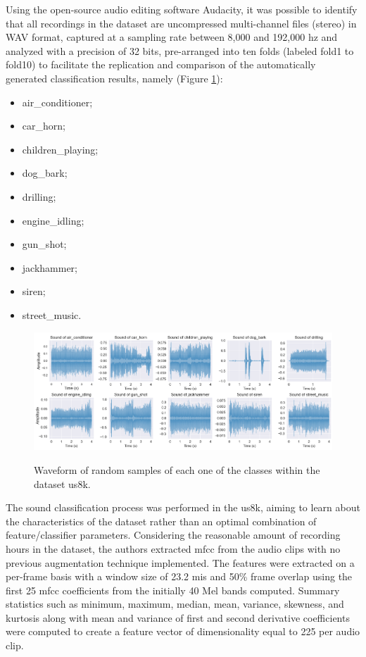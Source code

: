 Using the open-source audio editing software Audacity, it was possible to identify that all recordings in the dataset are uncompressed multi-channel files (stereo) in WAV format, captured at a sampling rate between 8,000 and 192,000 \gls{hz} and analyzed with a precision of 32 bits, pre-arranged into ten folds (labeled fold1 to fold10) to facilitate the replication and comparison of the automatically generated classification results, namely (Figure \ref{fig:methods_dataset_US8K}):
\begin{itemize}
    \item air\_conditioner;
    \item car\_horn;
    \item children\_playing; 
    \item dog\_bark; 
    \item drilling; 
    \item engine\_idling; 
    \item gun\_shot; 
    \item jackhammer; 
    \item siren; 
    \item street\_music.
\end{itemize}

\vspace{12pt}

\begin{figure}[htbp]
    \raggedright
        \caption{Waveform of random samples of each one of the classes within the dataset \gls{us8k}.}
        \includegraphics[width=1\textwidth]{resources/images/050-methods/Methods_dataset_US8K.png}
        \label{fig:methods_dataset_US8K}
\end{figure}

The sound classification process was performed in the \gls{us8k}, aiming to learn about the characteristics of the dataset rather than an optimal combination of feature/classifier parameters. Considering the reasonable amount of recording hours in the dataset, the authors extracted \gls{mfcc} from the audio clips with no previous augmentation technique implemented. The features were extracted on a per-frame basis with a window size of 23.2 \gls{mi}\gls{s} and 50\% frame overlap using the first 25 \gls{mfcc} coefficients from the initially 40 Mel bands computed. Summary statistics such as minimum, maximum, median, mean, variance, skewness, and kurtosis along with mean and variance of first and second derivative coefficients were computed to create a feature vector of dimensionality equal to 225 per audio clip.

